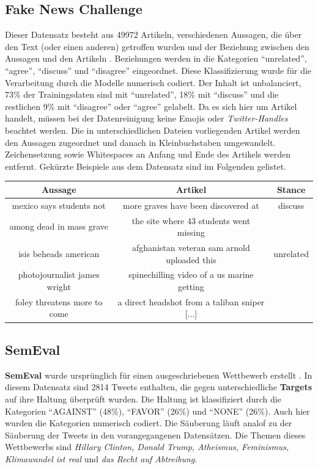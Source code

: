 \subsection{Fake News Challenge}
\label{sec:tfnc}
Dieser Datensatz besteht aus 49972 Artikeln, verschiedenen Aussagen, die \"uber den Text (oder einen anderen) getroffen wurden und der Beziehung zwischen den Aussagen und den Artikeln \cite{fnc}. Beziehungen werden in die Kategorien "`unrelated"', "`agree"', "`discuss"' und "`disagree"' eingeordnet. Diese Klassifizierung wurde f\"ur die Verarbeitung durch die Modelle numerisch codiert. Der Inhalt ist unbalanciert, 73\% der Trainingsdaten sind mit "`unrelated"', 18\% mit "`discuss"' und die restlichen 9\% mit "`disagree"' oder "`agree"' gelabelt. Da es sich hier um Artikel handelt, m\"ussen bei der Datenreinigung keine Emojis oder \textit{Twitter-Handles} beachtet werden. Die in unterschiedlichen Dateien vorliegenden Artikel werden den Aussagen zugeordnet und danach in Kleinbuchstaben umgewandelt. Zeichensetzung sowie Whitespaces an Anfang und Ende des Artikels werden entfernt. Gek\"urzte Beispiele aus dem Datensatz sind im Folgenden gelistet.
\begin{center}
\begin{tabular}{|c|c|c|}
\hline
Aussage & Artikel & Stance\\ 
\hline\hline
 mexico says students not& more graves have been discovered at  & discuss\\
 among dead in mass grave & the site where 43 students went missing &\\
\hline
isis beheads american & afghanistan veteran sam arnold uploaded this & unrelated\\
 photojournalist james wright & spinechilling  video of a us marine getting &\\
 foley threatens more to come & a direct headshot from a taliban sniper [...] &\\
\hline    
\end{tabular}
\end{center}

\subsection{SemEval}
\label{sec:semeval}
\textbf{SemEval} wurde urspr\"unglich f\"ur einen ausgeschriebenen Wettbewerb erstellt \cite{semeval}. In diesem Datensatz sind 2814 Tweets enthalten, die gegen unterschiedliche \textbf{Targets} auf ihre Haltung \"uberpr\"uft wurden. Die Haltung ist klassifiziert durch die Kategorien "`AGAINST"' (48\%), "`FAVOR"' (26\%) und "`NONE"' (26\%). Auch hier wurden die Kategorien numerisch codiert. Die S\"auberung l\"auft analof zu der S\"auberung der Tweets in den vorangegangenen Datens\"atzen. Die Themen dieses Wettbewerbs sind \textit{Hillary Clinton, Donald Trump, Atheismus, Feminismus, Klimawandel ist real} und \textit{das Recht auf Abtreibung}.

